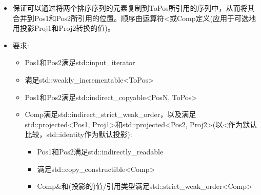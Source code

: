 \begin{itemize}
\item
保证可以通过将两个排序序列的元素复制到ToPos所引用的序列中，从而将其合并到Pos1和Pos2所引用的位置。顺序由运算符<或Comp定义(应用于可选地用投影Proj1和Proj2转换的值)。

\item
要求:
\begin{itemize}
\item
Pos1和Pos2满足std::input\_iterator

\item
满足std::weakly\_incrementable<ToPos>

\item
Pos1和Pos2满足std::indirect\_copyable<PosN, ToPos>

\item
Comp满足std::indirect\_strict\_weak\_order，以及满足std::projected<Pos1, Proj1>和std::projected<Pos2, Proj2>(以<作为默认比较，std::identity作为默认投影):

\begin{itemize}
\item
Pos1和Pos2满足std::indirectly\_readable

\item
满足std::copy\_constructible<Comp>

\item
Comp\&和(投影的)值/引用类型满足std::strict\_weak\_order<Comp>
\end{itemize}
\end{itemize}
\end{itemize}


